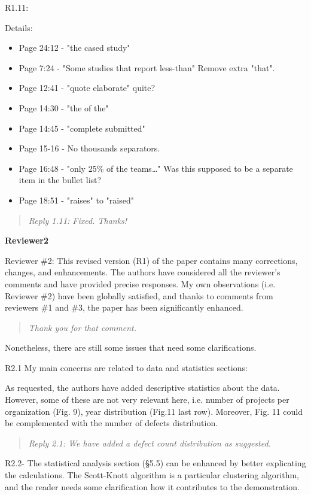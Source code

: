 \documentclass[smallcondensed]{svjour3}
\newcommand{\bi}{\begin{itemize}}%
\newcommand{\ei}{\end{itemize}}
\begin{document}
R1.11:

Details:
\bi
\item Page 24:12 - "the cased study"
\item Page 7:24 - "Some studies that report less-than" Remove extra "that".
\item Page 12:41 - "quote elaborate" quite?
\item Page 14:30 - "the of the"
\item Page 14:45 - "complete submitted"
\item Page 15-16 - No thousands separators.
\item Page 16:48 - "only 25\% of the teams…" Was this supposed to be a separate item in the bullet list?
\item Page 18:51 - "raises" to "raised"
\ei
\begin{quote}{\em 
Reply 1.11: Fixed. Thanks!
}\end{quote}

{\bf Reviewer2}

Reviewer \#2: This revised version (R1) of the paper contains many corrections, changes, and enhancements. The authors have considered all the reviewer's comments and have provided precise responses. My own observations (i.e. Reviewer \#2) have been globally satisfied, and thanks to comments from reviewers \#1 and \#3, the paper has been significantly enhanced.

\begin{quote}{\em 
Thank you for that comment.
}\end{quote}

Nonetheless, there are still some issues that need some clarifications.

R2.1 My main concerns are related to data and statistics sections:

As requested, the authors have added descriptive statistics about the data. However, some of these are not very relevant here, i.e. number of projects per organization (Fig. 9), year distribution (Fig.11 last row). Moreover, Fig. 11 could be complemented with the number of defects distribution.

\begin{quote}{\em 
Reply 2.1: We have added a defect count distribution as suggested.
}\end{quote}

R2.2- The statistical analysis section (§5.5) can be enhanced by better explicating the calculations. The Scott-Knott algorithm is a particular clustering algorithm, and the reader needs some clarification how it contributes to the demonstration.
\end{document}
